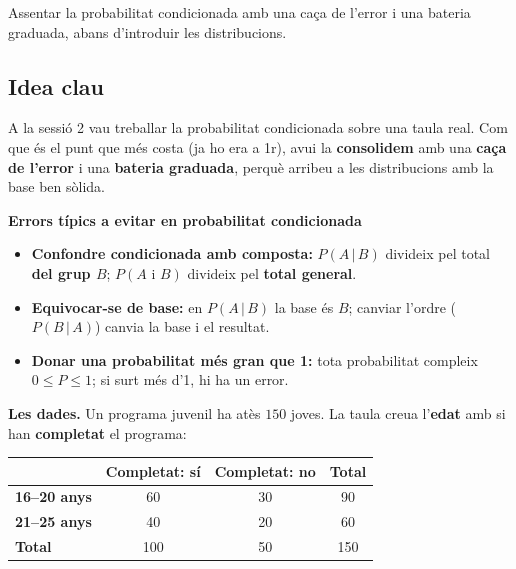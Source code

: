 %
{Assentar la probabilitat condicionada amb una caça de l'error i una bateria graduada, abans d'introduir les distribucions.}

\subsection{Idea clau}

A la sessió 2 vau treballar la probabilitat condicionada sobre una taula real. Com que és
el punt que més costa (ja ho era a 1r), avui la \textbf{consolidem} amb una \textbf{caça
de l'error} i una \textbf{bateria graduada}, perquè arribeu a les distribucions amb la
base ben sòlida.

\begin{idea}
\textbf{Errors típics a evitar en probabilitat condicionada}
\begin{itemize}[leftmargin=1.4em, itemsep=2pt]
  \item \textbf{Confondre condicionada amb composta:} $P(A\,|\,B)$ divideix pel total
        \textbf{del grup $B$}; $P(A\text{ i }B)$ divideix pel \textbf{total general}.
  \item \textbf{Equivocar-se de base:} en $P(A\,|\,B)$ la base és $B$; canviar l'ordre
        ($P(B\,|\,A)$) canvia la base i el resultat.
  \item \textbf{Donar una probabilitat més gran que 1:} tota probabilitat compleix
        $0\le P\le 1$; si surt més d'1, hi ha un error.
\end{itemize}
\end{idea}

\noindent\textbf{Les dades.} Un programa juvenil ha atès $150$ joves. La taula creua
l'\textbf{edat} amb si han \textbf{completat} el programa:
\begin{center}
\renewcommand{\arraystretch}{1.3}
\begin{tabular}{l c c c}
\toprule
 & \textbf{Completat: sí} & \textbf{Completat: no} & \textbf{Total} \\
\midrule
\textbf{16--20 anys} & 60  & 30 & 90 \\
\textbf{21--25 anys} & 40  & 20 & 60 \\
\midrule
\textbf{Total}       & 100 & 50 & 150 \\
\bottomrule
\end{tabular}
\end{center}

